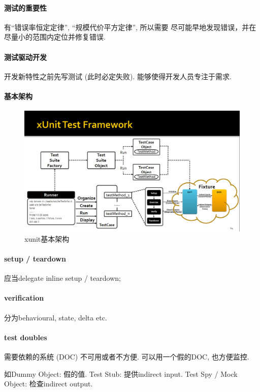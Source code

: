 \documentclass{ctexart}
\begin{document}
\paragraph{测试的重要性} 有``错误率恒定定律'', ``规模代价平方定律'', 所以需要
    尽可能早地发现错误，并在尽量小的范围内定位并修复错误.
\paragraph{测试驱动开发}
    开发新特性之前先写测试 (此时必定失败). 能够使得开发人员专注于需求.
\paragraph{基本架构}
    \begin{figure}[ht!]
        \centering
        \includegraphics[width=\textwidth, height=\textheight, keepaspectratio]{xunit-1.png}
        \caption{xunit基本架构}
    \end{figure}
\paragraph{setup / teardown} 应当delegate inline setup / teardown;
\paragraph{verification} 分为behavioural, state, delta etc.
\paragraph{test doubles} 需要依赖的系统 (DOC) 不可用或者不方便. 可以用一个假的DOC, 也方便监控.\par
    如Dummy Object: 假的值. Test Stub: 提供indirect input. Test Spy / Mock Object: 检查indirect output.
    
\end{document}
